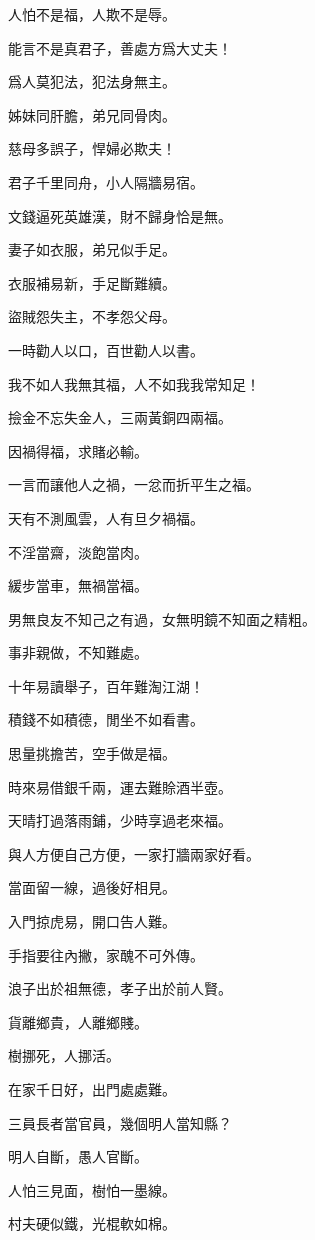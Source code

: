 \documentclass[12pt,a4paper]{ctexbook}
\begin{document}
人怕不是福，人欺不是辱。\par
能言不是真君子，善處方爲大丈夫！\par
爲人莫犯法，犯法身無主。\par
姊妹同肝膽，弟兄同骨肉。\par
慈母多誤子，悍婦必欺夫！\par
君子千里同舟，小人隔牆易宿。\par
文錢逼死英雄漢，財不歸身恰是無。\par
妻子如衣服，弟兄似手足。\par
衣服補易新，手足斷難續。\par
盜賊怨失主，不孝怨父母。\par
一時勸人以口，百世勸人以書。\par
我不如人我無其福，人不如我我常知足！\par
撿金不忘失金人，三兩黃銅四兩福。\par
因禍得福，求賭必輸。\par
一言而讓他人之禍，一忿而折平生之福。\par
天有不測風雲，人有旦夕禍福。\par
不淫當齋，淡飽當肉。\par
緩步當車，無禍當福。\par
男無良友不知己之有過，女無明鏡不知面之精粗。\par
事非親做，不知難處。\par
十年易讀舉子，百年難淘江湖！\par
積錢不如積德，閒坐不如看書。\par
思量挑擔苦，空手做是福。\par
時來易借銀千兩，運去難賒酒半壺。\par
天晴打過落雨鋪，少時享過老來福。\par
與人方便自己方便，一家打牆兩家好看。\par
當面留一線，過後好相見。\par
入門掠虎易，開口告人難。\par
手指要往內撇，家醜不可外傳。\par
浪子出於祖無德，孝子出於前人賢。\par
貨離鄉貴，人離鄉賤。\par
樹挪死，人挪活。\par
在家千日好，出門處處難。\par
三員長者當官員，幾個明人當知縣？\par
明人自斷，愚人官斷。\par
人怕三見面，樹怕一墨線。\par
村夫硬似鐵，光棍軟如棉。\par
\end{document}
